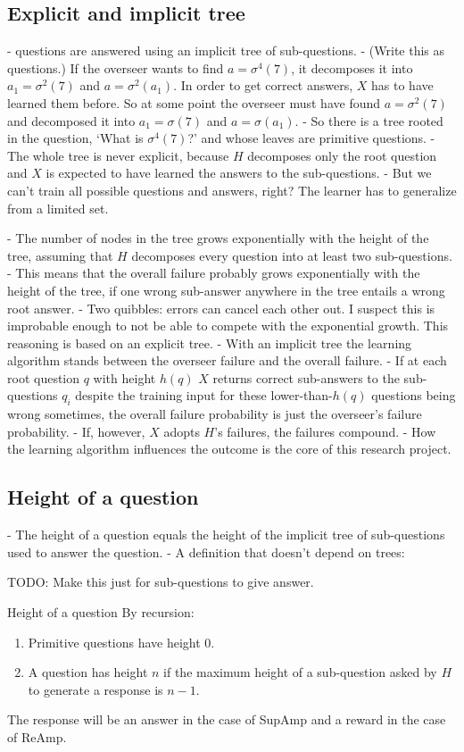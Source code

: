 \subsection{Explicit and implicit tree}

- questions are answered using an implicit tree of sub-questions.
- (Write this as questions.) If the overseer wants to find $a = \sigma^4(7)$, it
decomposes it into $a_1 = \sigma^2(7)$ and $a = \sigma^2(a_1)$. In order to get
correct answers, $X$ has
to have learned them before. So at some point the overseer must have found $a =
\sigma^2(7)$ and decomposed it into $a_1 = \sigma(7)$ and $a = \sigma(a_1)$.
- So there is a tree rooted in the question, ‘What is $\sigma^4(7)$?’ and whose
leaves are primitive questions.
- The whole tree is never explicit, because $H$ decomposes only the root
question and $X$ is expected to have learned the answers to the sub-questions.
- But we can't train all possible questions and answers, right? The learner has
to generalize from a limited set.

- The number of nodes in the tree grows exponentially with the height of the
tree, assuming that $H$ decomposes every question into at least two
sub-questions.
- This means that the overall failure probably grows exponentially with the
height of the tree, if one wrong sub-answer anywhere in the tree entails a wrong
root answer.
- Two quibbles: errors can cancel each other out. I suspect this is improbable
enough to not be able to compete with the exponential growth. This reasoning is
based on an explicit tree.
- With an implicit tree the learning algorithm stands between the overseer
failure and the overall failure.
- If at each root question $q$ with height $h(q)$ $X$ returns correct
sub-answers to the sub-questions $q_i$ despite the training input for these
lower-than-$h(q)$ questions being wrong sometimes, the overall failure
probability is just the overseer's failure probability.
- If, however, $X$ adopts $H$'s failures, the failures compound.
- How the learning algorithm influences the outcome is the core of this research
project.


\subsection{Height of a question}

- The height of a question equals the height of the implicit tree of
sub-questions used to answer the question.
- A definition that doesn't depend on trees:

TODO: Make this just for sub-questions to give answer.
\begin{def}{Height of a question} By recursion:
    \begin{enumerate}
    \item Primitive questions have height 0.
    \item A question has height $n$ if the maximum height of a sub-question
        asked by $H$ to generate a response is $n-1$.
    \end{enumerate}
The response will be an answer in the case of SupAmp and a reward in the case of
ReAmp.
\end{def}

